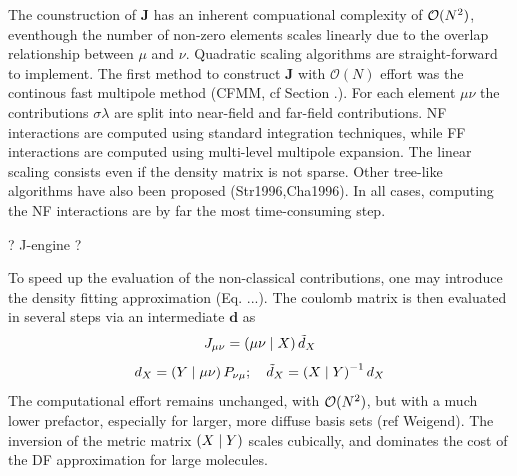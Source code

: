 \noindent The counstruction of $\mathbf{J}$ has an inherent compuational complexity of $\mathcal{O}(N^{2})$, eventhough the number of non-zero elements scales linearly due to the overlap relationship between $\mu$ and $\nu$. Quadratic scaling algorithms are straight-forward to implement. The first method to construct $\mathbf{J}$ with $\mathcal{O}(N)$ effort was the continous fast multipole method (CFMM, cf Section .). For each element $\mu\nu$ the contributions $\sigma\lambda$ are split into near-field and far-field contributions. NF interactions are computed using standard integration techniques, while FF interactions are computed using multi-level multipole expansion. The linear scaling consists even if the density matrix is not sparse. Other tree-like algorithms have also been proposed (Str1996,Cha1996). In all cases, computing the NF interactions are by far the most time-consuming step.

? J-engine ?

To speed up the evaluation of the non-classical contributions, one may introduce the density fitting approximation (Eq. ...). The coulomb matrix is then evaluated in several steps via an intermediate $\mathbf{d}$ as 
\begin{equation}
J_{\mu\nu} = \left( \mu\nu \mid X \right) \tilde{d}_X
\end{equation}
\begin{equation}
d_X = \left( Y \mid \mu\nu \right) P_{\nu\mu} ; \quad \tilde{d}_X = \left( X \mid Y \right)^{-1} d_X 
\end{equation}
\noindent The computational effort remains unchanged, with $\mathcal{O}(N^{2})$, but with a much lower prefactor, especially for larger, more diffuse basis sets (ref Weigend). The inversion of the metric matrix $\left( X \mid Y \right)$ scales cubically, and dominates the cost of the DF approximation for large molecules. 

